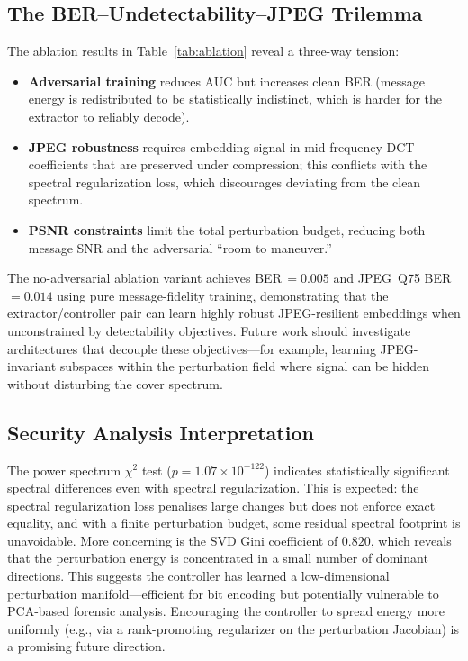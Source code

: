 \documentclass[journal]{IEEEtran}
\begin{document}
\subsection{The BER--Undetectability--JPEG Trilemma}

The ablation results in Table~\ref{tab:ablation} reveal a three-way tension:
\begin{itemize}[itemsep=1pt]
    \item \textbf{Adversarial training} reduces AUC but increases clean BER (message energy is
          redistributed to be statistically indistinct, which is harder for the extractor to
          reliably decode).
    \item \textbf{JPEG robustness} requires embedding signal in mid-frequency DCT coefficients
          that are preserved under compression; this conflicts with the spectral regularization
          loss, which discourages deviating from the clean spectrum.
    \item \textbf{PSNR constraints} limit the total perturbation budget, reducing both
          message SNR and the adversarial ``room to maneuver.''
\end{itemize}
The no-adversarial ablation variant achieves BER\,$=\!0.005$ and JPEG~Q75 BER\,$=\!0.014$
using pure message-fidelity training, demonstrating that the extractor/controller pair can
learn highly robust JPEG-resilient embeddings when unconstrained by detectability objectives.
Future work should investigate architectures that decouple these objectives---for example,
learning JPEG-invariant subspaces within the perturbation field where signal can be hidden
without disturbing the cover spectrum.

\subsection{Security Analysis Interpretation}

The power spectrum $\chi^2$ test ($p=1.07\times10^{-122}$) indicates statistically
significant spectral differences even with spectral regularization.
This is expected: the spectral regularization loss penalises large changes but does not
enforce exact equality, and with a finite perturbation budget, some residual spectral
footprint is unavoidable.
More concerning is the SVD Gini coefficient of $0.820$, which reveals that the perturbation
energy is concentrated in a small number of dominant directions.
This suggests the controller has learned a low-dimensional perturbation manifold---efficient
for bit encoding but potentially vulnerable to PCA-based forensic analysis.
Encouraging the controller to spread energy more uniformly (e.g., via a rank-promoting
regularizer on the perturbation Jacobian) is a promising future direction.
\end{document}
